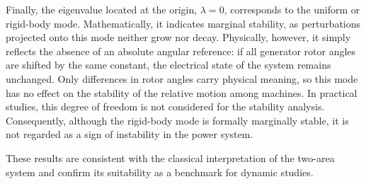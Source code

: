 Finally, the eigenvalue located at the origin, $\lambda = 0$, corresponds to the uniform or rigid-body mode. 
Mathematically, it indicates marginal stability, as perturbations projected onto this mode neither grow nor decay.
Physically, however, it simply reflects the absence of an absolute angular reference: if all generator rotor angles are shifted by the same constant, 
the electrical state of the system remains unchanged. Only differences in rotor angles carry physical meaning, so this mode has no effect on the stability 
of the relative motion among machines. In practical studies, this degree of freedom is not considered for the stability analysis. 
Consequently, although the rigid-body mode is formally marginally stable, it is not regarded as a sign of instability in the power system.
 
These results are consistent with the classical interpretation of the two-area system and confirm its suitability as a benchmark
 for dynamic studies.



